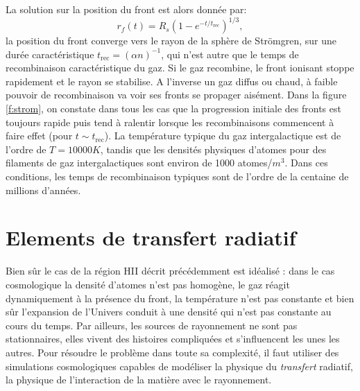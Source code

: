 La solution sur la position du front  est alors donnée par:
\begin{equation}
r_f(t)=R_s(1-e^{-t/t_\mathrm{rec}})^{1/3},
\end{equation}
la position du front converge vers le rayon de la sphère de Strömgren, sur une durée caractéristique $t_\mathrm{rec}=(\alpha n)^{-1}$, qui n'est autre que le temps de recombinaison caractéristique du gaz. Si le gaz recombine, le front ionisant stoppe rapidement et le rayon se stabilise. A l'inverse un gaz diffus ou chaud, à faible pouvoir de recombinaison va voir ses fronts se propager aisément. Dans la figure \ref{f:strom}, on constate dans tous les cas que la progression initiale des fronts est toujours rapide puis tend à ralentir lorsque les recombinaisons commencent à faire effet (pour $t\sim t_\mathrm{rec}$). La température typique du gaz intergalactique est de l'ordre de $T=10 000 K$, tandis que les densités physiques d'atomes pour des filaments de gaz intergalactiques sont environ de 1000 atomes/$m^3$. Dans ces conditions, les temps de recombinaison typiques sont de l'ordre de la centaine de millions d'années.

\section{Elements de transfert radiatif}

Bien sûr le cas de la région HII décrit précédemment est idéalisé : dans le cas cosmologique la densité d'atomes n'est pas homogène, le gaz réagit dynamiquement à la présence du front, la température n'est pas constante et bien sûr l'expansion de l'Univers conduit à une densité qui n'est pas constante au cours du temps. Par ailleurs, les sources de rayonnement ne sont pas stationnaires, elles vivent des histoires compliquées et s'influencent les unes les autres. Pour résoudre le problème dans toute sa complexité, il faut utiliser des simulations cosmologiques capables de modéliser la physique du \textit{transfert} radiatif, la physique de l'interaction de la matière avec le rayonnement. 

